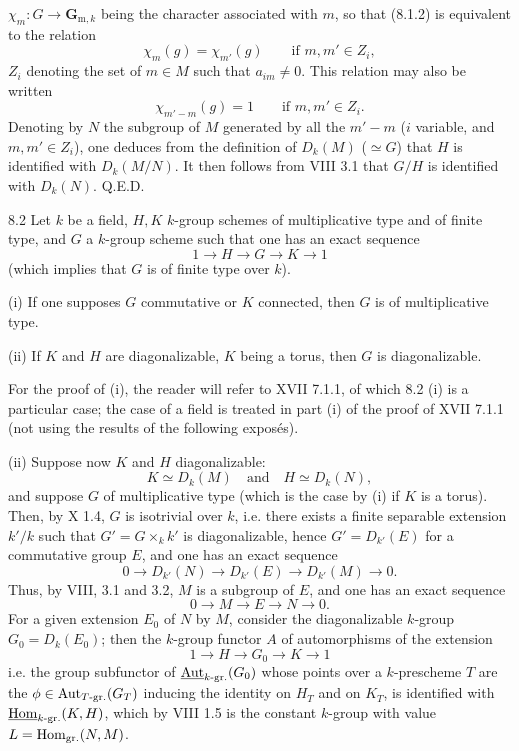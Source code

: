 $\chi_m:G\to\mathbf{G}_{\mathrm{m},k}$ being the character associated with $m$, so that (8.1.2) is equivalent to the relation
\begin{equation}\tag{8.1.4}
\chi_m(g)=\chi_{m'}(g)\qquad\text{if }m,m'\in Z_i,
\end{equation}
$Z_i$ denoting the set of $m\in M$ such that $a_{im}\ne0$. This relation may also be written
\[
\chi_{m'-m}(g)=1\qquad\text{if }m,m'\in Z_i.
\]
Denoting by $N$ the subgroup of $M$ generated by all the $m'-m$ ($i$ variable, and $m,m'\in Z_i$), one deduces from the definition of $D_k(M)$ ($\simeq G$) that $H$ is identified with $D_k(M/N)$. It then follows from VIII 3.1 that $G/H$ is identified with $D_k(N)$. \hfill Q.E.D.
\begin{proposition}{8.2}\label{IX.8.2}
 Let $k$ be a field, $H,K$ $k$-group schemes of multiplicative type and of finite type, and $G$ a $k$-group scheme such that one has an exact sequence
\[
1\to H\to G\to K\to1
\]
(which implies that $G$ is of finite type over $k$).

(i) If one supposes $G$ commutative or $K$ connected, then $G$ is of multiplicative type.

(ii) If $K$ and $H$ are diagonalizable, $K$ being a torus, then $G$ is diagonalizable.
\end{proposition}
For the proof of (i), the reader will refer to XVII 7.1.1, of which 8.2 (i) is a particular case; the case of a field is treated in part (i) of the proof of XVII 7.1.1 (not using the results of the following expos\'es).

(ii) Suppose now $K$ and $H$ diagonalizable:
\[
K\simeq D_k(M)\quad\text{and}\quad H\simeq D_k(N),
\]
\footnotemark[\value{footnote}] and suppose $G$ of multiplicative type (which is the case by (i) if $K$ is a torus). Then, by X 1.4, $G$ is isotrivial over $k$, i.e. there exists a finite separable extension $k'/k$ such that $G'=G\times_k k'$ is diagonalizable, hence $G'=D_{k'}(E)$ for a commutative group $E$, and one has an exact sequence
\begin{equation}\tag{1}
0\to D_{k'}(N)\to D_{k'}(E)\to D_{k'}(M)\to0.
\end{equation}
Thus, by VIII, 3.1 and 3.2, $M$ is a subgroup of $E$, and one has an exact sequence
\begin{equation}\tag{2}
0\to M\to E\to N\to0.
\end{equation}
For a given extension $E_0$ of $N$ by $M$, consider the diagonalizable $k$-group $G_0=D_k(E_0)$; then the $k$-group functor $A$ of automorphisms of the extension
\begin{equation}\tag{3}
1\to H\to G_0\to K\to1
\end{equation}
i.e. the group subfunctor of $\underline{\operatorname{Aut}}_{k\text{-}\mathrm{gr.}}(G_0)$ whose points over a $k$-prescheme $T$ are the $\phi\in\operatorname{Aut}_{T\text{-}\mathrm{gr.}}(G_T)$ inducing the identity on $H_T$ and on $K_T$, is identified with $\underline{\operatorname{Hom}}_{k\text{-}\mathrm{gr.}}(K,H)$, which by VIII 1.5 is the constant $k$-group with value $L=\operatorname{Hom}_{\mathrm{gr.}}(N,M)$.

